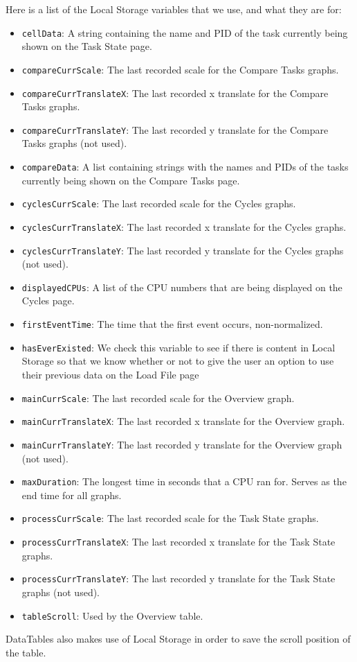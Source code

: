 \documentclass{hmcclinic}
\begin{document}
Here is a list of the Local Storage variables that we use, and what they are for:
\begin{itemize}
  \item \texttt{cellData}: A string containing the name and PID of the task currently being
  shown on the Task State page. 
\item \texttt{compareCurrScale}: The last recorded scale for the Compare Tasks graphs.
\item \texttt{compareCurrTranslateX}: The last recorded x translate for the Compare Tasks
  graphs.
\item \texttt{compareCurrTranslateY}: The last recorded y translate for the Compare Tasks
  graphs (not used).
\item \texttt{compareData}: A list containing strings with the names and PIDs of the
  tasks currently being shown on the Compare Tasks page.
\item \texttt{cyclesCurrScale}: The last recorded scale for the Cycles graphs.	
\item \texttt{cyclesCurrTranslateX}: The last recorded x translate for the Cycles graphs.
\item \texttt{cyclesCurrTranslateY}: The last recorded y translate for the Cycles graphs
  (not used).
\item \texttt{displayedCPUs}: A list of the CPU numbers that are being displayed on the
  Cycles page.
\item \texttt{firstEventTime}: The time that the first event occurs, non-normalized.
\item \texttt{hasEverExisted}: We check this variable to see if there is content in Local Storage so that we know whether or not to give the user an option to use their previous data on the Load File page	
\item \texttt{mainCurrScale}: The last recorded scale for the Overview graph.	
\item \texttt{mainCurrTranslateX}: The last recorded x translate for the Overview graph.
\item \texttt{mainCurrTranslateY}: The last recorded y translate for the Overview graph
  (not used). %
\item \texttt{maxDuration}: The longest time in seconds that a CPU ran for. Serves as
  the end time for all graphs.
\item \texttt{processCurrScale}: The last recorded scale for the Task State graphs.
\item \texttt{processCurrTranslateX}: The last recorded x translate for the Task State
  graphs.
\item \texttt{processCurrTranslateY}: The last recorded y translate for the Task State
  graphs (not used).
\item \texttt{tableScroll}: Used by the Overview table.
\end{itemize}
DataTables also makes use of Local Storage in order to save the scroll position of the table.
\end{document}
